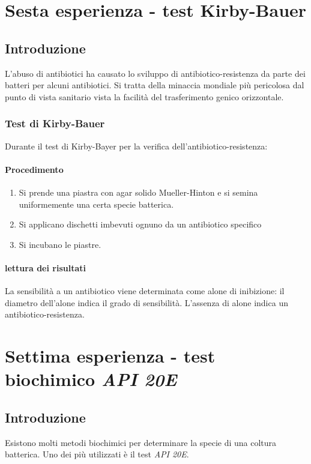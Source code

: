 \section{Sesta esperienza - test Kirby-Bauer}

	\subsection{Introduzione}
	L'abuso di antibiotici ha causato lo sviluppo di antibiotico-resistenza da parte dei batteri per alcuni antibiotici.
	Si tratta della minaccia mondiale pi\`u pericolosa dal punto di vista sanitario vista la facilit\`a del trasferimento genico orizzontale.
	
		\subsubsection{Test di Kirby-Bauer}
		Durante il test di Kirby-Bayer per la verifica dell'antibiotico-resistenza:
			
			\paragraph{Procedimento}
			\begin{enumerate}
				\item Si prende una piastra con agar solido Mueller-Hinton e si semina uniformemente una certa specie batterica.
				\item Si applicano dischetti imbevuti ognuno da un antibiotico specifico
				\item Si incubano le piastre.
			\end{enumerate}

			\paragraph{lettura dei risultati}
			La sensibilit\`a a un antibiotico viene determinata come alone di inibizione: il diametro dell'alone indica il grado di sensibilit\`a.
			L'assenza di alone indica un antibiotico-resistenza.

\section{Settima esperienza - test biochimico \emph{API 20E}}

	\subsection{Introduzione}
	Esistono molti metodi biochimici per determinare la specie di una coltura batterica.
	Uno dei pi\`u utilizzati \`e il test \emph{API 20E}.

